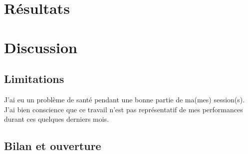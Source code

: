 \documentclass[12pt]{article}
\begin{document}
\section{Résultats}

\section{Discussion}
\subsection{Limitations}

J'ai eu un problème de santé pendant une bonne partie de ma(mes) session(s). J'ai bien conscience que ce travail n'est pas représentatif de mes performances durant ces quelques derniers mois.

\subsection{Bilan et ouverture}






\cite{komarov2013hunter}
\cite{Abramovskaya2016hunt} \cite{britnell2012finding} \cite{guggiari2018approximating} \cite{tayy2016evasion}

\end{document}
